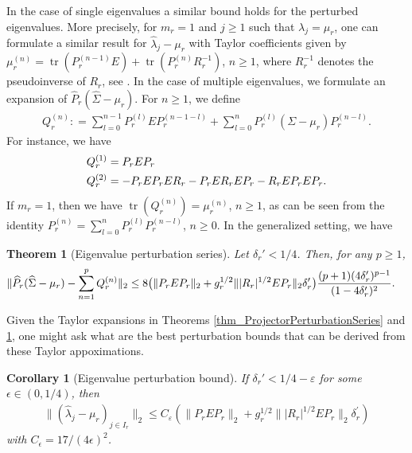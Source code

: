 \documentclass[a4paper,11pt]{article} %
\numberwithin{equation}{section}
\theoremstyle{definition}
\theoremstyle{remark}
\theoremstyle{plain}
\newtheorem{corollary}[definition]{Corollary}
\newtheorem{theorem}[definition]{Theorem}
\begin{document}
In the case of single eigenvalues a similar bound holds for the perturbed eigenvalues.
More precisely, for $ m_r = 1 $ and $j\geq 1$ such that $\lambda_j=\mu_r$, one can formulate a similar result for $ \widehat \lambda_j - \mu_r $ with Taylor coefficients given by $ \mu_r^{(n)} = \operatorname{tr}(P_{r}^{(n - 1)} E) + \operatorname{tr}(P_{r}^{(n)} R_{r}^{-1})$, $ n \geq 1$, where \( R_{r}^{-1} \) denotes the pseudoinverse of \( R_{r} \), see \cite{Wahl2026PertubationExpansionsI}.
In the case of multiple eigenvalues, we formulate an expansion of $ \widehat{P}_{r} (\widehat{\Sigma} - \mu_r) $.
For $ n \geq 1 $, we define
\begin{align}
  Q_{r}^{(n)}: = \sum_{l = 0}^{n-1} P_{r}^{(l)} E                  P_{r}^{(n - 1 - l)} 
               + \sum_{l = 0}^{n}   P_{r}^{(l)} (\Sigma - \mu_{r}) P_{r}^{(n     - l)}.
\end{align}
For instance, we have
\begin{align}
  Q_{r}^{(1)} &= P_rEP_r\\
  Q_{r}^{(2)} &= - P_rEP_rER_r - P_rER_rEP_r - R_rEP_rEP_r.
  \notag
\end{align}
If $ m_r = 1 $, then we have $ \operatorname{tr}(Q_r^{(n)}) = \mu_r^{(n)} $, \( n \ge 1 \), as can
be seen from the identity $ P_r^{(n)} = \sum_{l = 0}^n P_r^{(l)} P_r^{(n - l)} $, $ n \ge 0 $.
In the generalized setting, we have

\begin{theorem}[Eigenvalue perturbation series]%
  \label{thm_EigenvaluePerturbationSeries}
    Let \( \delta_{r}' < 1 / 4 \). Then, for any \( p \ge 1 \), 
  \begin{align}
          \| \widehat{P}_{r} (\widehat{ \Sigma } - \mu_r) - \sum_{n = 1}^{p} Q_{r}^{(n)} \|_{2} 
    & \le
          8 \big( \| P_rEP_r \|_{2} 
                + g_r^{1/2} \| |R_{r}|^{1/2} E P_r \|_{2}\delta_r^\prime   
            \big)
            \frac{(p + 1) (4 \delta_r')^{p - 1}}{(1 - 4 \delta_r')^2}.
    \notag
  \end{align}
\end{theorem}%

Given the Taylor expansions in Theorems \ref{thm_ProjectorPerturbationSeries} and \ref{thm_EigenvaluePerturbationSeries}, one might ask what are the best perturbation bounds that can be derived from these Taylor appoximations.

\begin{corollary}[Eigenvalue perturbation bound]%
  \label{cor_EigenvaluePerturbationBound}
  If \( \delta_r' < 1 / 4 - \varepsilon \) for some $\epsilon\in(0,1/4)$, then
  \begin{align}
          \|(\widehat\lambda_j-\mu_r)_{j\in I_r}\|_{2}
    \leq
          C_{\varepsilon} ( \| P_{r} E P_{r} \|_{2} + g_r^{1/2} \| |R_{r}|^{1/2} E P_r \|_{2}\delta_r^\prime )
  \end{align}
  with $ C_\epsilon = 17/ (4 \epsilon)^2 $.
\end{corollary}%
\end{document}
